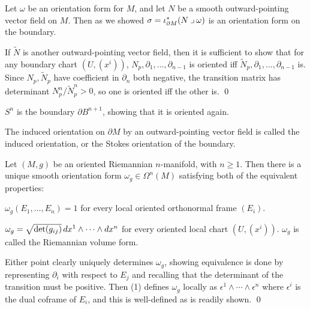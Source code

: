 \eprop

\bproof

    Let $\omega$ be an orientation form for $M$, and let $N$ be a smooth outward-pointing vector field on $M$.
    Then as we showed $\sigma=\iota^*_{\partial M}(N\imult\omega)$ is an orientation form on the boundary.

    If $\tilde N$ is another outward-pointing vector field, then it is sufficient to show that for any boundary
    chart $(U,(x^i))$, $N_p,\partial_1,\dots,\partial_{n-1}$ is oriented iff $\tilde N_p,\partial_1,\dots,\partial_{n-1}$
    is.
    Since $N_p,\tilde N_p$ have coefficient in $\partial_n$ both negative, the transition matrix has determinant
    $N^n_p/\tilde N^n_p>0$, so one is oriented iff the other is.
    \qed

\eproof

\bexam

    $S^n$ is the boundary $\partial B^{n+1}$, showing that it is oriented again.

\eexam

\bdefn

    The induced orientation on $\partial M$ by an outward-pointing vector field is called the {\emphcolor induced
    orientation}, or the {\emphcolor Stokes orientation} of the boundary.

\edefn

\bprop

    Let $(M,g)$ be an oriented Riemannian $n$-manifold, with $n\geq1$.
    Then there is a unique smooth orientation form $\omega_g\in\Omega^n(M)$ satisfying both of the equivalent properties:
    \benum
        \item $\omega_g(E_1,\dots,E_n)=1$ for every local oriented orthonormal frame $(E_i)$.
        \item $\omega_g=\sqrt{\mathop{\rm det}\nolimits(g_{ij})}\mathop{}\!d x^1\wedge\cdots\wedge\mathop{}\!d x^n$ for every oriented local chart $(U,(x^i))$.
    \eenum
    $\omega_g$ is called the {\emphcolor Riemannian volume form}.

\eprop

\bproof

    Either point clearly uniquely determines $\omega_g$, showing equivalence is done by representing $\partial_i$
    with respect to $E_j$ and recalling that the determinant of the transition must be positive.
    Then (1) defines $\omega_g$ locally as $\epsilon^1\wedge\cdots\wedge\epsilon^n$ where $\epsilon^i$ is the dual
    coframe of $E_i$, and this is well-defined as is readily shown.
    \qed

\eproof

